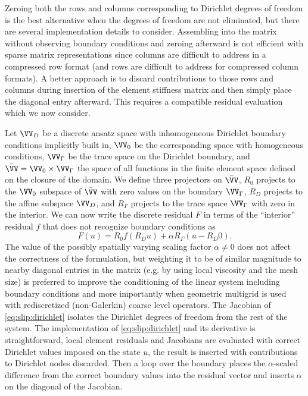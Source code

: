 Zeroing both the rows and columns corresponding to Dirichlet degrees of freedom is the best alternative when the degrees of freedom are not eliminated, but there are several implementation details to consider.
Assembling into the matrix without observing boundary conditions and zeroing afterward is not efficient with sparse matrix representations since columns are difficult to address in a compressed row format (and rows are difficult to address for compressed column formats).
A better approach is to discard contributions to those rows and columns during insertion of the element stiffness matrix and then simply place the diagonal entry afterward.
This requires a compatible residual evaluation which we now consider.

Let $\VV_D$ be a discrete ansatz space with inhomogeneous Dirichlet boundary conditions implicitly built in, $\VV_0$ be the corresponding space with homogeneous conditions, $\VV_\Gamma$ be the trace space on the Dirichlet boundary, and $\bar\VV = \VV_0 \times \VV_\Gamma$ the space of all functions in the finite element space defined on the closure of the domain.
We define three projectors on $\bar\VV$,  $R_0$ projects to the $\VV_0$ subspace of $\bar\VV$ with zero values on the boundary $\VV_\Gamma$, $R_D$ projects to the affine subspace $\VV_D$, and $R_\Gamma$ projects to the trace space $\VV_\Gamma$ with zero in the interior.
We can now write the discrete residual $F$ in terms of the ``interior'' residual $f$ that does not recognize boundary conditions as
\begin{equation}\label{eq:slip:dirichlet}
  F(u) = R_0 f(R_D u) + \alpha R_\Gamma (u - R_D 0) .
\end{equation}
The value of the possibly spatially varying scaling factor $\alpha \ne 0$ does not affect the correctness of the formulation, but weighting it to be of similar magnitude to nearby diagonal entries in the matrix (e.g. by using local viscosity and the mesh size) is preferred to improve the conditioning of the linear system including boundary conditions and more importantly when geometric multigrid is used with rediscretized (non-Galerkin) coarse level operators.
The Jacobian of \eqref{eq:slip:dirichlet} isolates the Dirichlet degrees of freedom from the rest of the system.
The implementation of \eqref{eq:slip:dirichlet} and its derivative is straightforward, local element residuals and Jacobians are evaluated with correct Dirichlet values imposed on the state $u$, the result is inserted with contributions to Dirichlet nodes discarded.
Then a loop over the boundary places the $\alpha$-scaled difference from the correct boundary values into the residual vector and inserts $\alpha$ on the diagonal of the Jacobian.

